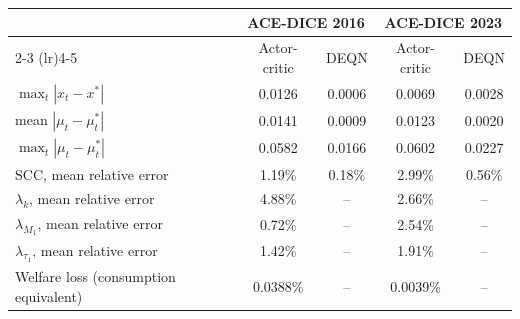 \begin{tabular}{lcccc}
\toprule
 & \multicolumn{2}{c}{ACE-DICE 2016} & \multicolumn{2}{c}{ACE-DICE 2023} \\
\cmidrule(lr){2-3} \cmidrule(lr){4-5}
 & Actor-critic & DEQN & Actor-critic & DEQN \\
\midrule
$\max_t |x_t - x^*|$ & 0.0126 & 0.0006 & 0.0069 & 0.0028 \\
mean $|\mu_t - \mu_t^*|$ & 0.0141 & 0.0009 & 0.0123 & 0.0020 \\
$\max_t |\mu_t - \mu_t^*|$ & 0.0582 & 0.0166 & 0.0602 & 0.0227 \\
SCC, mean relative error & 1.19\% & 0.18\% & 2.99\% & 0.56\% \\
$\lambda_k$, mean relative error & 4.88\% & -- & 2.66\% & -- \\
$\lambda_{M_1}$, mean relative error & 0.72\% & -- & 2.54\% & -- \\
$\lambda_{\tau_1}$, mean relative error & 1.42\% & -- & 1.91\% & -- \\
Welfare loss (consumption equivalent) & 0.0388\% & -- & 0.0039\% & -- \\
\bottomrule
\end{tabular}
